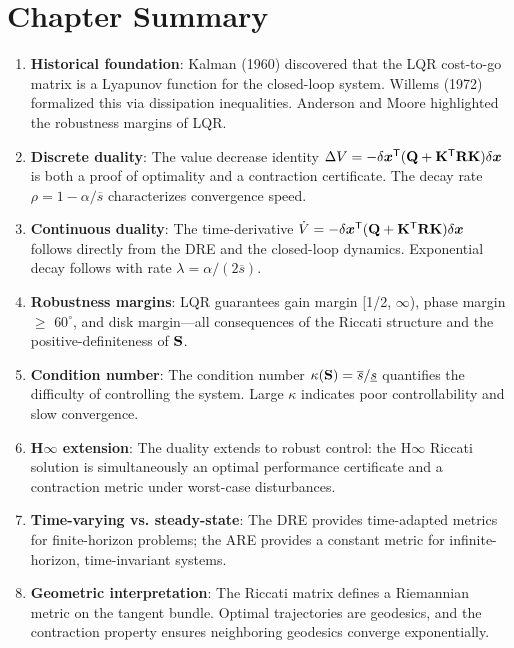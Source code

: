 \section{Chapter Summary}

\begin{enumerate}
\item \textbf{Historical foundation}: Kalman (1960) discovered that the LQR cost-to-go matrix is a Lyapunov function
      for the closed-loop system. Willems (1972) formalized this via dissipation inequalities. Anderson and Moore
      highlighted the robustness margins of LQR.

\item \textbf{Discrete duality}: The value decrease identity $\Delta V = -\delta\bm{x}^{\mathsf{T}}(\mathbf{Q} + \mathbf{K}^{\mathsf{T}}\mathbf{R}\mathbf{K})\delta\bm{x}$
      is both a proof of optimality and a contraction certificate. The decay rate $\rho = 1 - \alpha/\overline{s}$
      characterizes convergence speed.

\item \textbf{Continuous duality}: The time-derivative $\dot{V} = -\delta\bm{x}^{\mathsf{T}}(\mathbf{Q} + \mathbf{K}^{\mathsf{T}}\mathbf{R}\mathbf{K})\delta\bm{x}$ follows
      directly from the DRE and the closed-loop dynamics. Exponential decay follows with rate $\lambda = \alpha/(2\overline{s})$.

\item \textbf{Robustness margins}: LQR guarantees gain margin [1/2, $\infty$), phase margin $\geq$ $60^\circ$, and disk margin---all
      consequences of the Riccati structure and the positive-definiteness of $\mathbf{S}$.

\item \textbf{Condition number}: The condition number $\kappa(\mathbf{S}) = \overline{s}/\underline{s}$ quantifies the
      difficulty of controlling the system. Large $\kappa$ indicates poor controllability and slow convergence.

\item \textbf{H$\infty$ extension}: The duality extends to robust control: the H$\infty$ Riccati solution is simultaneously an optimal
      performance certificate and a contraction metric under worst-case disturbances.

\item \textbf{Time-varying vs. steady-state}: The DRE provides time-adapted metrics for finite-horizon problems; the ARE
      provides a constant metric for infinite-horizon, time-invariant systems.

\item \textbf{Geometric interpretation}: The Riccati matrix defines a Riemannian metric on the tangent bundle. Optimal
      trajectories are geodesics, and the contraction property ensures neighboring geodesics converge exponentially.


\end{enumerate}
